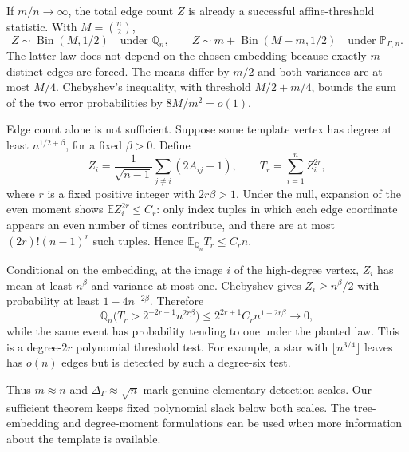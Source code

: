 \documentclass[11pt]{article}
\newcommand{\E}{\mathbb E}
\newcommand{\Pp}{\mathbb P}
\newcommand{\Qq}{\mathbb Q}
\newcommand{\1}{\mathbf 1}
\theoremstyle{definition}
\theoremstyle{remark}
\numberwithin{equation}{section}
\begin{document}
If $m/n\to\infty$, the total edge count $Z$ is already a successful affine-threshold statistic. With $M=\binom n2$,
\[
 Z\sim\operatorname{Bin}(M,1/2)\quad\text{under }\Qq_n,
 \qquad
 Z\sim m+\operatorname{Bin}(M-m,1/2)\quad\text{under }\Pp_{\Gamma,n}.
\]
The latter law does not depend on the chosen embedding because exactly $m$ distinct edges are forced. The means differ by $m/2$ and both variances are at most $M/4$. Chebyshev's inequality, with threshold $M/2+m/4$, bounds the sum of the two error probabilities by $8M/m^2=o(1)$.

Edge count alone is not sufficient. Suppose some template vertex has degree at least $n^{1/2+\beta}$, for a fixed $\beta>0$. Define
\[
 Z_i=\frac1{\sqrt{n-1}}\sum_{j\ne i}(2A_{ij}-1),
 \qquad T_r=\sum_{i=1}^n Z_i^{2r},
\]
where $r$ is a fixed positive integer with $2r\beta>1$. Under the null, expansion of the even moment shows $\E Z_i^{2r}\le C_r$: only index tuples in which each edge coordinate appears an even number of times contribute, and there are at most $(2r)!(n-1)^r$ such tuples. Hence $\E_{\Qq_n}T_r\le C_rn$.

Conditional on the embedding, at the image $i$ of the high-degree vertex, $Z_i$ has mean at least $n^\beta$ and variance at most one. Chebyshev gives $Z_i\ge n^\beta/2$ with probability at least $1-4n^{-2\beta}$. Therefore
\[
 \Qq_n\bigl(T_r>2^{-2r-1}n^{2r\beta}\bigr)
 \le 2^{2r+1}C_rn^{1-2r\beta}\to0,
\]
while the same event has probability tending to one under the planted law. This is a degree-$2r$ polynomial threshold test. For example, a star with $\lfloor n^{3/4}\rfloor$ leaves has $o(n)$ edges but is detected by such a degree-six test.

Thus $m\approx n$ and $\Delta_\Gamma\approx\sqrt n$ mark genuine elementary detection scales. Our sufficient theorem keeps fixed polynomial slack below both scales. The tree-embedding and degree-moment formulations can be used when more information about the template is available.
\end{document}
